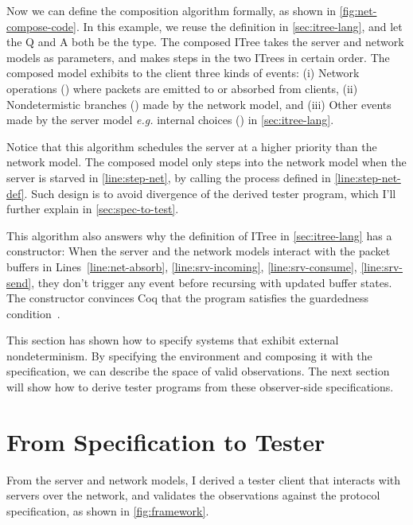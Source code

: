 Now we can define the composition algorithm formally, as shown in
\autoref{fig:net-compose-code}.  In this example, we reuse the 
definition in \autoref{sec:itree-lang}, and let the \ilc Q and \ilc A both be
the  type.  The composed ITree takes the server and network models
as parameters, and makes steps in the two ITrees in certain order.  The composed
model exhibits to the client three kinds of events: (i) Network operations
() where packets are emitted to or absorbed from clients, (ii)
Nondetermistic branches () made by the network model, and (iii)
Other events  made by the server model {\it e.g.} internal choices
() in \autoref{sec:itree-lang}.

Notice that this algorithm schedules the server at a higher priority than the
network model.  The composed model only steps into the network model when the
server is starved in \autoref{line:step-net}, by calling the 
process defined in \autoref{line:step-net-def}.  Such design is to avoid
divergence of the derived tester program, which I'll further explain in
\autoref{sec:spec-to-test}.

This algorithm also answers why the definition of ITree in
\autoref{sec:itree-lang} has a  constructor: When the server and the
network models interact with the packet buffers in Lines~\ref{line:net-absorb},
\ref{line:srv-incoming}, \ref{line:srv-consume}, \ref{line:srv-send}, they don't
trigger any event before recursing with updated buffer states.  The 
constructor convinces Coq that the program satisfies the guardedness
condition~\cite{coinduction}.  

This section has shown how to specify systems that exhibit external
nondeterminism.  By specifying the environment and composing it with the
specification, we can describe the space of valid observations.  The next
section will show how to derive tester programs from these observer-side
specifications.

\section{From Specification to Tester}
\label{sec:spec-to-test}

From the server and network models, I derived a tester client that interacts
with servers over the network, and validates the observations against the
protocol specification, as shown in \autoref{fig:framework}.

